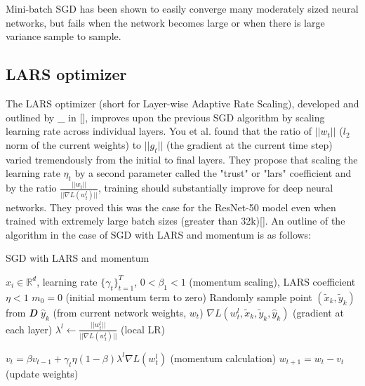 Mini-batch SGD has been shown to easily converge many moderately sized neural networks, but fails when the network becomes large or when there is large variance sample to sample.
\subsection*{LARS optimizer}

The LARS optimizer (short for Layer-wise Adaptive Rate Scaling), developed and outlined by \_ in [], improves upon the previous SGD algorithm by scaling learning rate across individual layers. You et al. found that the ratio of $||w_t||$ ($l_2$ norm of the current weights) to $||g_t||$ (the gradient at the current time step) varied tremendously from the initial to final layers. They propose that scaling the learning rate $\eta_t$ by a second parameter called the "trust" or "lars" coefficient and by the ratio $\frac{||w_t||}{||\nabla L(w_t^l)||}$, training should substantially improve for deep neural networks. They proved this was the case for the ResNet-50 model even when trained with extremely large batch sizes (greater than 32k)[]. An outline of the algorithm in the case of SGD with LARS and momentum is as follows:
\begin{minipage}[b]{.48\textwidth}
\begin{algorithm}[H]\small
	\caption{SGD with LARS and momentum}
	\label{alg:lars}
	\begin{algorithmic}
	    \vspace{3pt}
		 $x_i \in \mathbb{R}^d$, learning rate $\{\gamma_t\}_{t=1}^T$, $0 < \beta_{1} < 1$ (momentum scaling), LARS coefficient $\eta <1$
		\vspace{3pt}
		\STATE $m_{0} = 0$ (initial momentum term to zero)
		\vspace{2pt}
		\STATE Randomly sample point $(\tilde x_k,\tilde y_k)$ from \textbf{\textit{D}}
        \vspace{3pt}
		\STATE $\hat y_k$ (from current network weights, $w_t$)
		\vspace{2pt}
        \STATE $\nabla L(w_t^l,\tilde x_k,\tilde y_k,\hat y_k)$ (gradient at each layer)
        \vspace{3pt}
        \STATE $\lambda^l \gets \frac{||w_t^l||}{||\nabla L(w_t^l)||}$ (local LR)
        \vspace{3pt}
        
        \STATE $v_{t} = \beta v_{t-1} + \gamma_t\eta(1 - \beta)\lambda^l\nabla L(w_t^l)$ (momentum calculation)
        \vspace{3pt}
		\STATE $w_{t+1} = w_{t} - v_t$ (update weights)
		\vspace{3pt}
		\ENDFOR
	\end{algorithmic}
\end{algorithm}
\end{minipage}\hfill%
